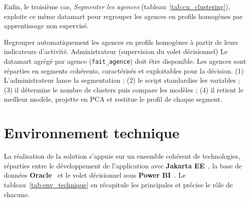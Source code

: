 Enfin, le troisième cas, \emph{Segmenter les agences} (tableau~\ref{tab:cu_clustering}),
exploite ce même datamart pour regrouper les agences en profils homogènes par
apprentissage non supervisé.

{Regrouper automatiquement les agences en profils homogènes à partir de leurs
indicateurs d'activité.}
{Administrateur (supervision du volet décisionnel)}
{Le datamart agrégé par agence (\texttt{fait\_agence}) doit être disponible.}
{Les agences sont réparties en segments cohérents, caractérisés et exploitables
pour la décision.}
{(1) L'administrateur lance la segmentation ; (2) le script standardise les variables ;
(3) il détermine le nombre de clusters puis compare les modèles ; (4) il retient
le meilleur modèle, projette en PCA et restitue le profil de chaque segment.}

\section{Environnement technique}
La réalisation de la solution s'appuie sur un ensemble cohérent de technologies,
réparties entre le développement de l'application avec \textbf{Jakarta
EE}~\cite{jakartaee}, la base de données \textbf{Oracle}~\cite{oracle} et le volet
décisionnel sous \textbf{Power BI}~\cite{powerbi}. Le
tableau~\ref{tab:env_technique} en récapitule les principales et précise le rôle de
chacune.

